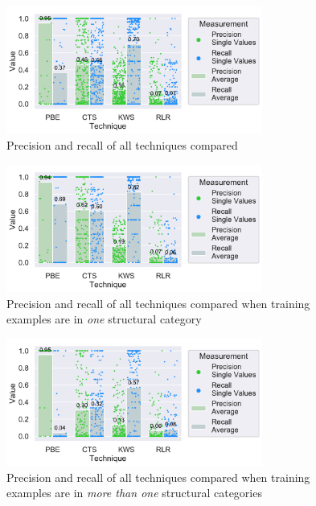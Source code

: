 \documentclass[\myrootdir/main.tex]{subfiles}
\begin{document}
\begin{figure}[htbp]
		\centering
		\includegraphics[width=0.75\textwidth, clip]{img/big-study/recall-precision-all.pdf}
		\caption{Precision and recall of all techniques compared}
		\label{fig:recall-precision-all}
\end{figure}

\begin{figure}[htbp]
	\centering
		\includegraphics[width=0.75\textwidth, clip]{img/big-study/recall-precision-singlecategory-all.pdf}
		\caption{Precision and recall of all techniques compared when training examples are in \emph{one} structural category}
		\label{fig:recall-precision-singlecategory-all}
\end{figure}

\begin{figure}[htbp]
		\centering
		\includegraphics[width=0.75\textwidth, clip]{img/big-study/recall-precision-multicategory-all.pdf}
		\caption{Precision and recall of all techniques compared when training examples are in \emph{more than one} structural categories}
		\label{fig:recall-precision-multicategory-all}
\end{figure}
\end{document}
